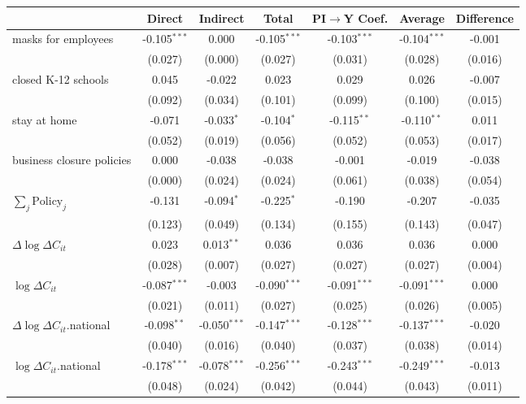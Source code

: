 
\begin{tabular}{lccccc|>{}c}
\toprule
  & Direct & Indirect & Total & PI$\to$Y Coef. & Average & Difference\\
\midrule
masks for employees & -0.105$^{***}$ & 0.000 & -0.105$^{***}$ & -0.103$^{***}$ & -0.104$^{***}$ & -0.001\\
 & (0.027) & (0.000) & (0.027) & (0.031) & (0.028) & (0.016)\\
closed K-12 schools & 0.045 & -0.022 & 0.023 & 0.029 & 0.026 & -0.007\\
 & (0.092) & (0.034) & (0.101) & (0.099) & (0.100) & (0.015)\\
stay at home & -0.071 & -0.033$^{*}$ & -0.104$^{*}$ & -0.115$^{**}$ & -0.110$^{**}$ & 0.011\\
 & (0.052) & (0.019) & (0.056) & (0.052) & (0.053) & (0.017)\\
business closure policies & 0.000 & -0.038 & -0.038 & -0.001 & -0.019 & -0.038\\
 & (0.000) & (0.024) & (0.024) & (0.061) & (0.038) & (0.054)\\
$\sum_j \mathrm{Policy}_j$ & -0.131 & -0.094$^{*}$ & -0.225$^{*}$ & -0.190 & -0.207 & -0.035\\
 & (0.123) & (0.049) & (0.134) & (0.155) & (0.143) & (0.047)\\
$\Delta \log \Delta C_{it}$ & 0.023 & 0.013$^{**}$ & 0.036 & 0.036 & 0.036 & 0.000\\
 & (0.028) & (0.007) & (0.027) & (0.027) & (0.027) & (0.004)\\
$\log \Delta C_{it}$ & -0.087$^{***}$ & -0.003 & -0.090$^{***}$ & -0.091$^{***}$ & -0.091$^{***}$ & 0.000\\
 & (0.021) & (0.011) & (0.027) & (0.025) & (0.026) & (0.005)\\
$\Delta \log \Delta C_{it}$.national & -0.098$^{**}$ & -0.050$^{***}$ & -0.147$^{***}$ & -0.128$^{***}$ & -0.137$^{***}$ & -0.020\\
 & (0.040) & (0.016) & (0.040) & (0.037) & (0.038) & (0.014)\\
$\log \Delta C_{it}$.national & -0.178$^{***}$ & -0.078$^{***}$ & -0.256$^{***}$ & -0.243$^{***}$ & -0.249$^{***}$ & -0.013\\
 & (0.048) & (0.024) & (0.042) & (0.044) & (0.043) & (0.011)\\
\bottomrule
\end{tabular}